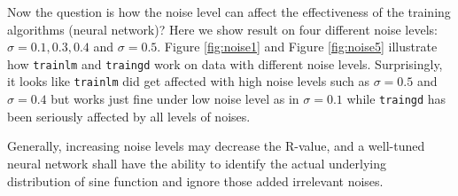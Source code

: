 \documentclass{article}
\begin{document}
Now the question is how the noise level can affect the effectiveness of the training algorithms (neural network)? Here we show result on four different noise levels: $\sigma=0.1, 0.3, 0.4$ and $\sigma=0.5$. Figure \ref{fig:noise1} and Figure \ref{fig:noise5} illustrate how \verb|trainlm| and \verb|traingd| work on data with different noise levels. Surprisingly, it looks like \verb|trainlm| did get affected with high noise levels such as $\sigma=0.5$ and $\sigma=0.4$ but works just fine under low noise level as in $\sigma=0.1$ while \verb|traingd| has been seriously affected by all levels of noises.

Generally, increasing noise levels may decrease the R-value, and a well-tuned neural network shall have the ability to identify the actual underlying distribution of sine function and ignore those added irrelevant noises.
\end{document}

